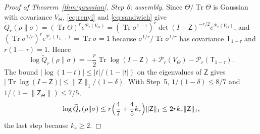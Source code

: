 \documentclass[aps,prl,reprint,longbibliography,raggedbottom]{revtex4-2}
\newcommand{\norm}[1]{\lVert #1\rVert}
\newcommand{\abs}[1]{\lvert #1\rvert}
\DeclareMathOperator{\Tr}{Tr}
\newcommand{\Qtil}{\widetilde Q}
\begin{document}
\begin{proof}[Proof of Theorem~\ref{thm:gaussian}]
\emph{Step 6: assembly.} Since $\Theta/\Tr\Theta$ is Gaussian with
covariance $V_\Theta$, \eqref{eq:renyi} and \eqref{eq:sandwich} give
$\Qtil_r(\rho\|\sigma)=(\Tr\Theta)^re^{\mathscr P_r(V_\Theta)}
=(\Tr\sigma^{1-\tau})^r\det(I-\mathsf Z)^{-r/2}e^{\mathscr P_r(V_\Theta)}$,
and $(\Tr\sigma^{1/r})^re^{\mathscr P_r(\mathsf T_{1-\tau})}=\Tr\sigma=1$
because $\sigma^{1/r}/\Tr\sigma^{1/r}$ has covariance
$\mathsf T_{1-\tau}$ and $r(1-\tau)=1$. Hence
\[
\log\Qtil_r(\rho\|\sigma)
=-\frac r2\Tr\log(I-\mathsf Z)+\mathscr P_r(V_\Theta)-\mathscr P_r(\mathsf T_{1-\tau}).
\]
The bound $\abs{\log(1-t)}\le\abs t/(1-\abs t)$ on the eigenvalues of
$\mathsf Z$ gives $\abs{\Tr\log(I-\mathsf Z)}\le\norm{\mathsf Z}_1/(1-\delta)$.
With Step~5, $1/(1-\delta)\le8/7$ and $1/(1-\norm{\mathsf Z_\Theta})\le7/5$,
\[
\log\Qtil_r(\rho\|\sigma)
\le r\Bigl(\frac47+\frac45k_r\Bigr)\norm{\mathsf Z}_1
\le2rk_r\norm{\mathsf Z}_1 ,
\]
the last step because $k_r\ge2$.
\end{proof}
\end{document}
